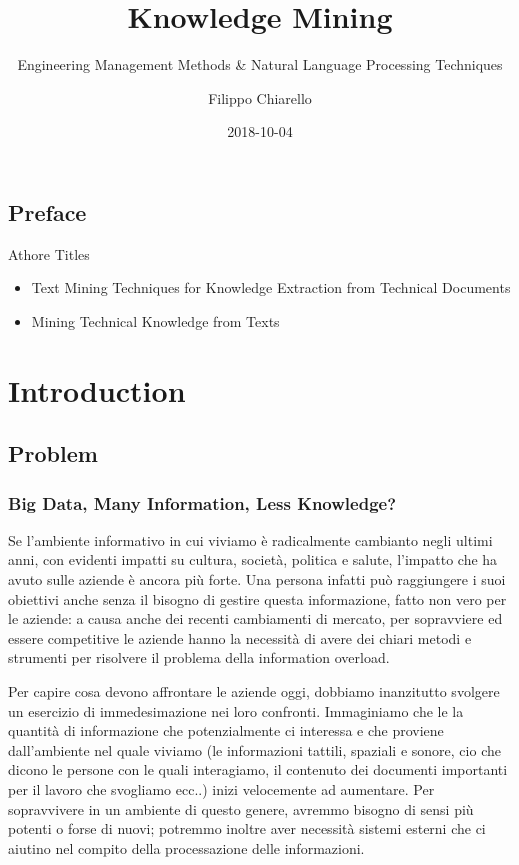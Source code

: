 \documentclass[]{book}
\title{Knowledge Mining}
\subtitle{Engineering Management Methods \& Natural Language Processing Techniques}
\author{Filippo Chiarello}
\date{2018-10-04}
\begin{document}
\maketitle

{
\setcounter{tocdepth}{1}
\tableofcontents
}
\chapter*{Preface}\label{preface}

Athore Titles

\begin{itemize}
\item
  Text Mining Techniques for Knowledge Extraction from Technical
  Documents
\item
  Mining Technical Knowledge from Texts
\end{itemize}

\part{Introduction}\label{part-introduction}

\chapter{Problem}\label{problem}

\section{Big Data, Many Information, Less
Knowledge?}\label{big-data-many-information-less-knowledge}

Se l'ambiente informativo in cui viviamo è radicalmente cambianto negli
ultimi anni, con evidenti impatti su cultura, società, politica e
salute, l'impatto che ha avuto sulle aziende è ancora più forte. Una
persona infatti può raggiungere i suoi obiettivi anche senza il bisogno
di gestire questa informazione, fatto non vero per le aziende: a causa
anche dei recenti cambiamenti di mercato, per sopravviere ed essere
competitive le aziende hanno la necessità di avere dei chiari metodi e
strumenti per risolvere il problema della information overload.

Per capire cosa devono affrontare le aziende oggi, dobbiamo inanzitutto
svolgere un esercizio di immedesimazione nei loro confronti. Immaginiamo
che le la quantità di informazione che potenzialmente ci interessa e che
proviene dall'ambiente nel quale viviamo (le informazioni tattili,
spaziali e sonore, cio che dicono le persone con le quali interagiamo,
il contenuto dei documenti importanti per il lavoro che svogliamo ecc..)
inizi velocemente ad aumentare. Per sopravvivere in un ambiente di
questo genere, avremmo bisogno di sensi più potenti o forse di nuovi;
potremmo inoltre aver necessità sistemi esterni che ci aiutino nel
compito della processazione delle informazioni.
\end{document}
